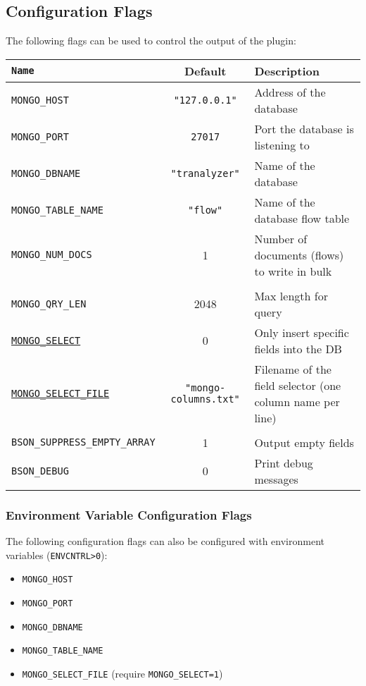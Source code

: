 \documentclass[documentation]{subfiles}
\begin{document}
\subsection{Configuration Flags}
The following flags can be used to control the output of the plugin:
\begin{longtable}{>{\tt}lcl}
    \toprule
    {\bf Name} & {\bf Default} & {\bf Description}\\
    \midrule\endhead%
    MONGO\_HOST        & {\small\tt "127.0.0.1"}  & Address of the database\\
    MONGO\_PORT        & {\small\tt 27017}        & Port the database is listening to\\
    MONGO\_DBNAME      & {\small\tt "tranalyzer"} & Name of the database\\
    MONGO\_TABLE\_NAME & {\small\tt "flow"}       & Name of the database flow table\\
    MONGO\_NUM\_DOCS   & 1                        & Number of documents (flows) to write in bulk\\
    \\
    MONGO\_QRY\_LEN    & 2048                     & Max length for query\\
    \hyperref[mongo:select]{MONGO\_SELECT}
                       & 0                        & Only insert specific fields into the DB\\
    \hyperref[mongo:select]{MONGO\_SELECT\_FILE}
                       & {\small\tt "mongo-columns.txt"}
                                                  & Filename of the field selector (one column name per line)\\
    \\
    BSON\_SUPPRESS\_EMPTY\_ARRAY & 1              & Output empty fields\\
    BSON\_DEBUG                  & 0              & Print debug messages\\
    \bottomrule
\end{longtable}

\subsubsection{Environment Variable Configuration Flags}
The following configuration flags can also be configured with environment variables ({\tt ENVCNTRL>0}):
\begin{itemize}
    \item {\tt MONGO\_HOST}
    \item {\tt MONGO\_PORT}
    \item {\tt MONGO\_DBNAME}
    \item {\tt MONGO\_TABLE\_NAME}
    \item {\tt MONGO\_SELECT\_FILE} (require {\tt MONGO\_SELECT=1})
\end{itemize}
\end{document}
